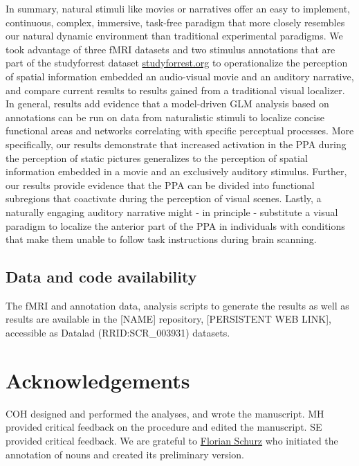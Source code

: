 \documentclass[english]{article}
\begin{document}
In summary, natural stimuli like movies \citep{eickhoff2020towards,
hasson2008neurocinematics, sonkusare2019naturalistic} or narratives
\citep{hamilton2018revolution, honey2012not, lerner2011topographic,
silbert2014coupled, wilson2008beyond} offer an easy to implement, continuous,
complex, immersive, task-free paradigm that more closely resembles our natural
dynamic environment than traditional experimental paradigms.
We took advantage of three fMRI datasets and two stimulus annotations that are
part of the studyforrest dataset
\href{http://www.studyforrest.org}{studyforrest.org} to operationalize the
perception of spatial information embedded an audio-visual movie and an auditory
narrative, and compare current results to results gained from a traditional
visual localizer.
In general, results add evidence that a model-driven GLM analysis based on
annotations can be run on data from naturalistic stimuli to localize concise
functional areas and networks correlating with specific perceptual processes.
More specifically, our results demonstrate that increased activation in the PPA
during the perception of static pictures generalizes to the perception of
spatial information embedded in a movie and an exclusively auditory stimulus.
Further, our results provide evidence that the PPA can be divided into
functional subregions that coactivate during the perception of visual
scenes.
Lastly, a naturally engaging auditory narrative might - in principle -
substitute a visual paradigm to localize the anterior part of the PPA in
individuals with conditions that make them unable to follow task instructions
during brain scanning.


\subsection*{Data and code availability}

The fMRI and annotation data, analysis scripts to generate the results as well
as results are available in the [NAME] repository, [PERSISTENT WEB LINK],
accessible as Datalad (RRID:SCR\_003931) datasets.


\section*{Acknowledgements}

%
COH designed and performed the analyses, and wrote the manuscript.
%
MH provided critical feedback on the procedure and edited the manuscript.
%
SE provided critical feedback.
%
We are grateful to \href{www.florianschurz.de}{Florian Schurz} who initiated the
annotation of nouns and created its preliminary version.%
\end{document}
